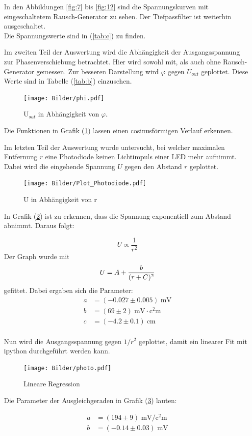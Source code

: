 In den Abbildungen \eqref{fig:7} bis \eqref{fig:12} sind die Spannungskurven mit
eingeschaltetem Rausch-Generator zu sehen. Der Tiefpassfilter ist weiterhin ausgeschaltet. \\
Die Spannungswerte sind in (\ref{tab:c}) zu finden. \\

\newpage

Im zweiten Teil der Auswertung wird die Abhängigkeit der Ausgangsspannung zur Phasenverschiebung
betrachtet. Hier wird sowohl mit, als auch ohne Rausch-Generator gemessen. Zur besseren
Darstellung wird $\varphi$ gegen $U_{out}$ geplottet. Diese Werte sind in Tabelle (\ref{tab:b}) einzusehen.

\begin{figure}[H]
  \centering
  \texttt{[image: Bilder/phi.pdf]}
  \caption{U$_{out}$ in Abhängigkeit von $\varphi$.}
  \label{fig:Uout}
\end{figure}

Die Funktionen in Grafik (\ref{fig:Uout}) lassen einen cosinusförmigen Verlauf erkennen. \\

\newpage


Im letzten Teil der Auswertung wurde untersucht, bei welcher maximalen Entfernung $r$
eine Photodiode keinen Lichtimpuls einer LED mehr aufnimmt. Dabei wird die eingehende Spannung $U$
gegen den Abstand $r$ geplottet.
\begin{figure}[H]
  \centering
  \texttt{[image: Bilder/Plot\_Photodiode.pdf]}
  \caption{U in Abhängigkeit von r}
  \label{fig:led}
\end{figure}

In Grafik (\ref{fig:led}) ist zu erkennen, dass die Spannung exponentiell zum Abstand
abnimmt. Daraus folgt:

\begin{equation*}
  U \propto \frac{1}{r^2}
\end{equation*}
Der Graph wurde mit
\begin{equation}
U = A + \frac{b}{(r+C)^2} \notag
\end{equation}
gefittet.
Dabei ergaben sich die Parameter:
\begin{align*}
  a &= (-0.027 ± 0.005) \; \si{\milli\volt} \\
  b &= (69 ± 2)    \;   \si{\milli\volt \cdot\square\centi\meter}        \\
  c &= (-4.2 ± 0.1) \; \si{\centi\meter}
\end{align*}
\\
Nun wird die Ausgangsspannung gegen $1/r^2$ geplottet, damit ein linearer Fit mit ipython durchgeführt
werden kann.

\begin{figure}[!h]
\centering
\texttt{[image: Bilder/photo.pdf]}
\caption{Lineare Regression}
\label{fig:lin}
\end{figure}

Die Parameter der Ausgleichgeraden in Grafik (\ref{fig:lin}) lauten:

\begin{align*}
    a &= (194 ± 9) \; \si{\milli\volt\per\square\centi\meter} \\
    b &= (-0.14 ± 0.03) \; \si{\milli\volt}
\end{align*}
